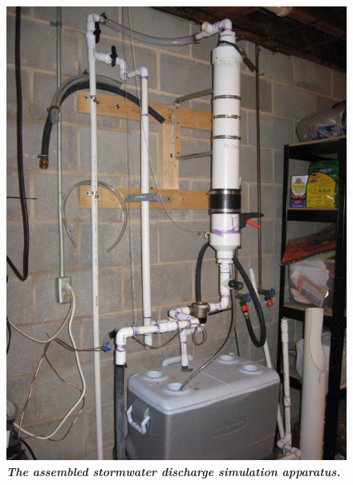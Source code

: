 \documentclass[12pt]{article}
\numberwithin{equation}{section}
\numberwithin{table}{section}
\numberwithin{figure}{section}
\begin{document}
\begin{center}
\begin{figure}
 \centering\includegraphics[scale=1.25]{dischargerPhoto.jpg}
 \caption[Stormwater Discharge Simulator]{\textbf{\emph{The assembled stormwater discharge simulation apparatus.}}\label{dischargerPhoto}}
\end{figure}
\end{center}
\end{document}
